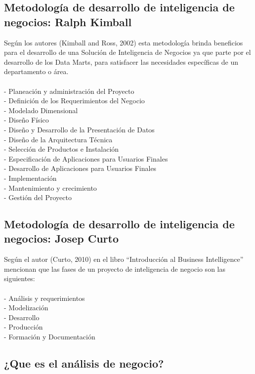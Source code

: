 \documentclass[twoside,twocolumn]{article}
\begin{document}
\subsection{Metodología de desarrollo de inteligencia de negocios: Ralph Kimball}
Según los autores (Kimball and Ross, 2002) esta metodología brinda
beneficios para el desarrollo de una Solución de Inteligencia de
Negocios ya que parte por el desarrollo de los Data Marts, para
satisfacer las necesidades específicas de un departamento o área.\\\\
- Planeación y administración del Proyecto\\
- Definición de los Requerimientos del Negocio\\
- Modelado Dimensional\\
- Diseño Físico\\
- Diseño y Desarrollo de la Presentación de Datos\\
- Diseño de la Arquitectura Técnica\\
- Selección de Productos e Instalación\\
- Especificación de Aplicaciones para Usuarios Finales\\
- Desarrollo de Aplicaciones para Usuarios Finales\\
- Implementación\\
- Mantenimiento y crecimiento\\
- Gestión del Proyecto\\

\subsection{Metodología de desarrollo de inteligencia de negocios: Josep Curto}
Según el autor (Curto, 2010) en el libro “Introducción al Business
Intelligence” mencionan que las fases de un proyecto de inteligencia
de negocio son las siguientes:\\\\
-  Análisis y requerimientos\\
- Modelización\\
- Desarrollo\\
- Producción\\
- Formación y Documentación

\subsection{¿Que es el análisis de negocio?}
\end{document}
